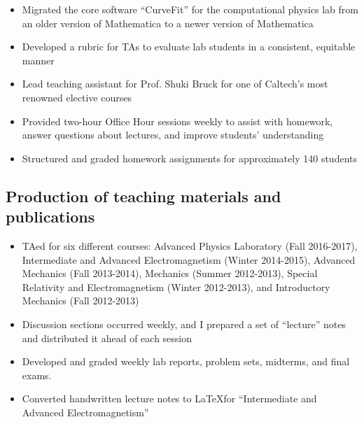 \begin{itemize}
	\setlength{\itemsep}{0em}
	\item Migrated the core software \enquote{CurveFit} for the computational physics lab from an older version of Mathematica to a newer version of Mathematica
	\item Developed a rubric for TAs to evaluate lab students in a consistent, equitable manner
\end{itemize}

\begin{itemize}
	\setlength{\itemsep}{0em}
	\item Lead teaching assistant for Prof. Shuki Bruck for one of Caltech's most renowned elective courses
	\item Provided two-hour Office Hour sessions weekly to assist with homework, answer questions about lectures, and improve students' understanding
	\item Structured and graded homework assignments for approximately 140 students
\end{itemize}

\subsection{Production of teaching materials and publications}\label{ssec:production-of-teaching-materials-and-publications}

\begin{itemize}
	\setlength{\itemsep}{0em}
	\item TAed for six different courses: Advanced Physics Laboratory (Fall 2016-2017), Intermediate and Advanced Electromagnetism (Winter 2014-2015), Advanced Mechanics (Fall 2013-2014), Mechanics (Summer 2012-2013), Special Relativity and Electromagnetism (Winter 2012-2013), and Introductory Mechanics (Fall 2012-2013)
	\item Discussion sections occurred weekly, and I prepared a set of \enquote{lecture} notes and distributed it ahead of each session
	\item Developed and graded weekly lab reports, problem sets, midterms, and final exams.
	\item Converted handwritten lecture notes to \LaTeX for \enquote{Intermediate and Advanced Electromagnetism}
\end{itemize}

